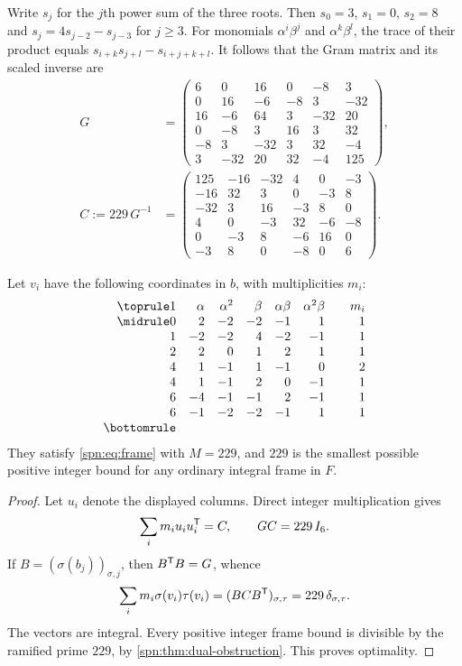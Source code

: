 Write $s_j$ for the $j$th power sum of the three roots. Then $s_0=3$, $s_1=0$,
$s_2=8$ and $s_j=4s_{j-2}-s_{j-3}$ for $j\ge3$. For monomials
$\alpha^i\beta^j$ and $\alpha^k\beta^l$, the trace of their product equals
$s_{i+k}s_{j+l}-s_{i+j+k+l}$. It follows that the Gram matrix and its scaled
inverse are
\begin{align*}
G&=\begin{pmatrix}
6&0&16&0&-8&3\\
0&16&-6&-8&3&-32\\
16&-6&64&3&-32&20\\
0&-8&3&16&3&32\\
-8&3&-32&3&32&-4\\
3&-32&20&32&-4&125
\end{pmatrix},\\[3pt]
C:=229\,G^{-1}&=\begin{pmatrix}
125&-16&-32&4&0&-3\\
-16&32&3&0&-3&8\\
-32&3&16&-3&8&0\\
4&0&-3&32&-6&-8\\
0&-3&8&-6&16&0\\
-3&8&0&-8&0&6
\end{pmatrix}.
\end{align*}

\begin{theorem}\label{spn:thm:optimal229}
Let $v_i$ have the following coordinates in $b$, with multiplicities $m_i$:
\[
\begin{array}{@{}rrrrrrcr@{}}
\toprule
1&\alpha&\alpha^2&\beta&\alpha\beta&\alpha^2\beta&&m_i\\\midrule
0&2&-2&-2&-1&1&&1\\
1&-2&-2&4&-2&-1&&1\\
2&2&0&1&2&1&&1\\
4&1&-1&1&-1&0&&2\\
4&1&-1&2&0&-1&&1\\
6&-4&-1&-1&2&-1&&1\\
6&-1&-2&-2&-1&1&&1\\\bottomrule
\end{array}
\]
They satisfy \eqref{spn:eq:frame} with $M=229$, and $229$ is the smallest
possible positive integer bound for any ordinary integral frame in $F$.
\end{theorem}

\begin{proof}
Let $u_i$ denote the displayed columns. Direct integer multiplication gives
\[
 \sum_im_iu_iu_i^{\mathsf{T}}=C,\qquad GC=229\,I_6 .
\]
If $B=(\sigma(b_j))_{\sigma,j}$, then $B^{\mathsf{T}}B=G$, whence
\[
 \sum_im_i\sigma(v_i)\tau(v_i)=(BCB^{\mathsf{T}})_{\sigma,\tau}
 =229\,\delta_{\sigma,\tau}.
\]
The vectors are integral. Every positive integer frame bound is divisible by
the ramified prime $229$, by \cref{spn:thm:dual-obstruction}. This proves
optimality.
\end{proof}

